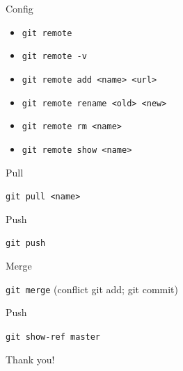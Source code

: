 \documentclass{beamer}
\begin{document}
    \begin{frame}{Config}
        \begin{itemize}[<+-| alert@+>]
            \item\texttt{git remote}
            \item\texttt{git remote -v}
            \item\texttt{git remote add <name> <url>}
            \item\texttt{git remote rename <old> <new>}
            \item\texttt{git remote rm <name>}
            \item\texttt{git remote show <name>}
        \end{itemize}
    \end{frame}

    \begin{frame}{Pull}
        \begin{center}
            \texttt{git pull <name>}
        \end{center}
    \end{frame}

    \begin{frame}{Push}
        \begin{center}
            \texttt{git push}
        \end{center}
    \end{frame}

    \begin{frame}{Merge}
        \begin{center}
            \texttt{git merge} (conflict git add; git commit)
        \end{center}
    \end{frame}

    \begin{frame}{Push}
        \begin{center}
            \texttt{git show-ref master}
        \end{center}
    \end{frame}

    \begin{frame}[standout]
        Thank you!
    \end{frame}

    \appendix
\end{document}
